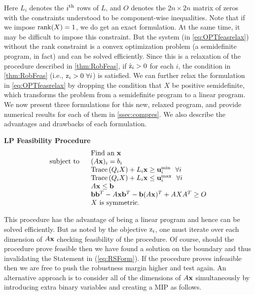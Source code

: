 %
Here $L_i$ denotes the $i^{\rm th}$ rows of $L$, and $O$ denotes the $2n \times 2n$ matrix of zeros with the constraints understood to be component-wise inequalities.
Note that if we impose $\operatorname{rank}(X)=1$, we do get an exact formulation.
At the same time, it may be difficult to impose this constraint.
But the system (in \cref{eq:OPTfeasrelax}) without the rank constraint is a convex optimization problem (a semidefinite program, in fact) and can be solved efficiently. 
Since this is a relaxation of the procedure described in \cref{thm:RobFeas}, if $\hat{\mathrm{z}}_i>0$ for each $i$, the condition in \cref{thm:RobFeas} (i.e., $\mathrm{z}_i>0 \ \forall i$) is satisfied. 
We can further relax the formulation in \cref{eq:OPTfeasrelax} by dropping the condition that $X$ be positive semidefinite, which transforms the problem from a semidefinite program to a linear program. 
We now present three formulations for this new, relaxed program, and provide numerical results for each of them in \cref{ssec:compres}.
We also describe the advantages and drawbacks of each formulation.

\bigskip
\bigskip
\textbf{LP Feasibility Procedure} 
\begin{equation} \label{eq:OPTfeasrelaxLP1}
\begin{array}{rl}
 &\text{Find an }\mathbf{x} \\
 \text{subject to } \ &(A\mathbf{x})_i= b_i \\
 &\operatorname{Trace}\left(Q_iX\right)+ L_i\mathbf{x} \geq \mathbf{u}_i^{\min}  \ \ \forall i\\
 & \operatorname{Trace}\left(Q_iX\right)+ L_i\mathbf{x} \leq \mathbf{u}_i^{\max}  \ \ \forall i\\
 	&A\mathbf{x}\leq \mathbf{b} \\
 	&\mathbf{b}\mathbf{b}^T-A\mathbf{x}\mathbf{b}^T-\mathbf{b}(A\mathbf{x})^T+AXA^T\geq O \\
 	&X \text{ is symmetric.}
\end{array}
\end{equation}


This procedure has the advantage of being a linear program and hence can be solved efficiently.
But as noted by the objective $\mathrm{z}_i$, one must iterate over each dimension of $A\mathbf{x}$ checking feasibility of the procedure. 
Of course, should the procedure prove feasible then we have found a solution on the boundary and thus invalidating the Statement in (\cref{eq:RSForm}). 
If the procedure proves infeasible then we are free to push the robustness margin higher and test again. 
An alternative approach is to consider all of the dimensions of $A\mathbf{x}$ simultaneously by introducing extra binary variables and creating a MIP as follows. 

